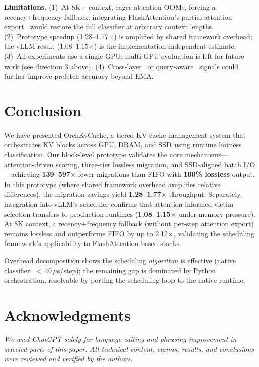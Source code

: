 \documentclass[conference]{IEEEtran}
\begin{document}
\textbf{Limitations.}
(1)~At 8K+ context, eager attention OOMs, forcing a recency+frequency fallback; integrating FlashAttention's partial attention export~\cite{flashattn2} would restore the full classifier at arbitrary context lengths.
(2)~Prototype speedup (1.28--1.77$\times$) is amplified by shared framework overhead; the vLLM result (1.08--1.15$\times$) is the implementation-independent estimate.
(3)~All experiments use a single GPU; multi-GPU evaluation is left for future work (see direction 3 above).
(4)~Cross-layer~\cite{infinigen} or query-aware~\cite{quest} signals could further improve prefetch accuracy beyond EMA.

\section{Conclusion}

We have presented OrchKvCache, a tiered KV-cache management system that orchestrates KV blocks across GPU, DRAM, and SSD using runtime hotness classification. Our block-level prototype validates the core mechanisms---attention-driven scoring, three-tier lossless migration, and SSD-aligned batch I/O---achieving \textbf{139--597$\times$} fewer migrations than FIFO with \textbf{100\% lossless} output. In this prototype (where shared framework overhead amplifies relative differences), the migration savings yield \textbf{1.28--1.77$\times$} throughput. Separately, integration into vLLM's scheduler confirms that attention-informed victim selection transfers to production runtimes (\textbf{1.08--1.15$\times$} under memory pressure). At 8K context, a recency+frequency fallback (without per-step attention export) remains lossless and outperforms FIFO by up to 2.12$\times$, validating the scheduling framework's applicability to FlashAttention-based stacks.

Overhead decomposition shows the scheduling \emph{algorithm} is effective (native classifier: $<$\,40\,$\mu$s/step); the remaining gap is dominated by Python orchestration, resolvable by porting the scheduling loop to the native runtime.

\section*{Acknowledgments}
\textit{We used ChatGPT solely for language editing and phrasing improvement in selected parts of this paper. All technical content, claims, results, and conclusions were reviewed and verified by the authors.}
\end{document}
